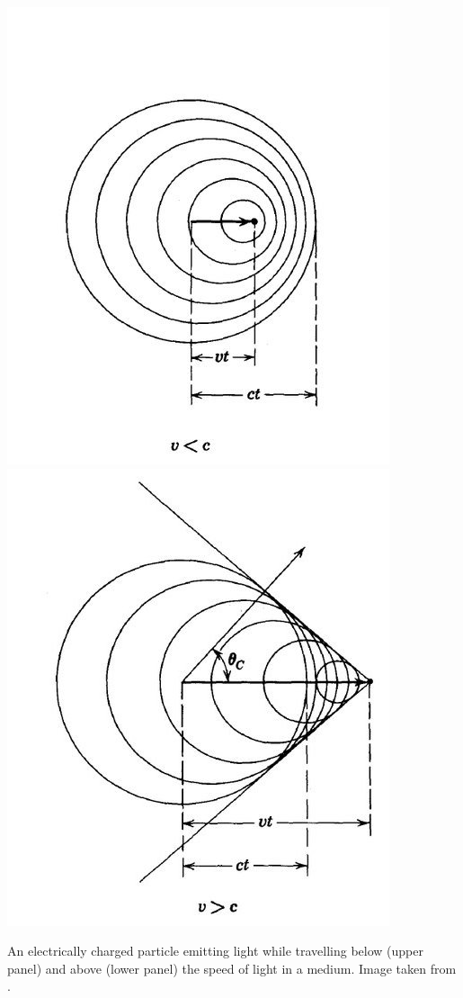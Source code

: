 \begin{marginfigure}
    \includegraphics[width=\textwidth]{figures/icecube/cherenkov/cherenkov_slow.jpeg}
    \includegraphics[width=\textwidth]{figures/icecube/cherenkov/cherenkov_fast.jpeg}
    \caption{An electrically charged particle emitting light while travelling below (upper panel) and above (lower panel) the speed of light in a medium. Image taken from \cite{jackson2012classical}.}
    \label{fig:cherenkov-sketch}
\end{marginfigure}

